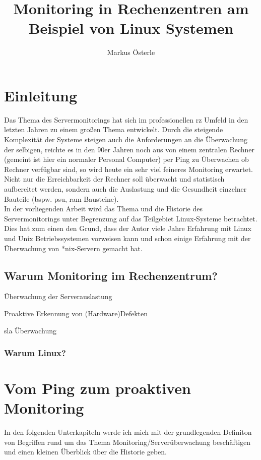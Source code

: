 \documentclass[12pt,a4paper,parskip]{scrreprt}
\author{Markus Österle}
\title{Monitoring in Rechenzentren am Beispiel von Linux Systemen}
\date{} %
\begin{document}
	\maketitle
	\setcounter{tocdepth}{3}
	\tableofcontents
	\onehalfspacing
	\chapter{Einleitung}
Das Thema des Servermonitorings hat sich im professionellen \acrshort{rz} Umfeld in den letzten Jahren zu einem großen Thema entwickelt. Durch die steigende Komplexität der Systeme steigen auch die Anforderungen an die Überwachung der selbigen, reichte es in den 90er Jahren noch aus von einem zentralen Rechner (gemeint ist hier ein normaler Personal Computer) per Ping zu Überwachen ob Rechner verfügbar sind, so wird heute ein sehr viel feineres Monitoring erwartet. Nicht nur die Erreichbarkeit der Rechner soll überwacht und statistisch aufbereitet werden, sondern auch die Auslastung und die Gesundheit einzelner Bauteile (bspw. \gls{psu}, \acrshort{ram} Bausteine). \\

In der vorliegenden Arbeit wird das Thema und die Historie des Servermonitorings unter Begrenzung auf das Teilgebiet Linux-Systeme betrachtet. Dies hat zum einen den Grund, dass der Autor viele Jahre Erfahrung mit Linux und Unix Betriebssystemen vorweisen kann und schon einige Erfahrung mit der Überwachung von *nix-Servern gemacht hat.
	\section{Warum Monitoring im Rechenzentrum?}
	
		Überwachung der Serverauslastung
		
		Proaktive Erkennung von (Hardware)Defekten
		
		\gls{sla} Überwachung
		\subsection{Warum Linux?}
	
	\chapter{Vom Ping zum proaktiven Monitoring}
	In den folgenden Unterkapiteln werde ich mich mit der grundlegenden Definiton von Begriffen rund um das Thema Monitoring/Serverüberwachung beschäftigen und einen kleinen Überblick über die Historie geben.
\end{document}
